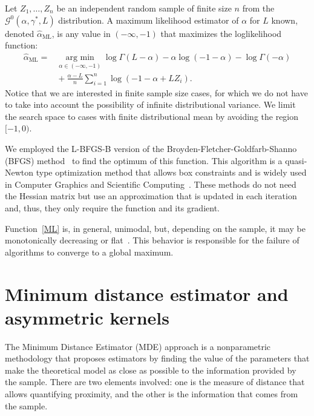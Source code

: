 \documentclass[twocolumn]{svjour3}
\newcommand{\argmin}{\operatorname*{\text{arg min }}}
\begin{document}
	Let $Z_1,\dots, Z_n$ be an independent random sample of finite size $n$ from the $\mathcal G^0(\alpha,\gamma^*,L)$ distribution.
	A maximum likelihood estimator of $\alpha$ for $L$ known, denoted $\widehat\alpha_{\text{{ML}}}$, is any value in $(-\infty,-1)$ that maximizes the loglikelihood function:
	\begin{align}
	\hat{\alpha}_{\text{{ML}}}=&\argmin_{\alpha \in (-\infty,-1)}\log \Gamma(L-\alpha)-
	\alpha\log(-1-\alpha)-\log\Gamma(-\alpha) \nonumber \\
	&\mbox{}+\frac{\alpha-L}{n} \sum_{i=1}^n\log(-1-\alpha+L Z_i).
	\label{ML}
	\end{align}
Notice that we are interested in finite sample size cases, for which we do not have to take into account the possibility of infinite distributional variance.
We limit the search space to cases with finite distributional mean by avoiding the region $[-1,0)$.
	
	We employed the L-BFGS-B version of the Broyden-Fletcher-Goldfarb-Shanno (BFGS) method~\cite{Luenberger2008} to find the optimum of this function. This algorithm is a quasi-Newton type optimization method that allows box constraints and is widely used in Computer Graphics and Scientific Computing~\cite{FEI2014}. 
	These methods do not need the Hessian matrix but use an approximation that is updated in each iteration and, thus, they only require the function and its gradient.
	
	Function~\eqref{ML} is, in general, unimodal, but, depending on the sample, it may be monotonically decreasing or flat~\cite{FreryCribariSouza:JASP:04}. 
	This behavior is responsible for the failure of algorithms to converge to a global maximum.
	
	
	\section{Minimum distance estimator and asymmetric kernels}
	\label{distancekernel}
	
	The Minimum Distance Estimator (MDE) approach is a nonparametric methodology that proposes estimators by finding the value of the parameters that make the theoretical model as close as possible to the information provided by the sample. 
	There are two elements involved: one is the measure of distance that allows quantifying proximity, and the other is the information that comes from the sample.
	
\end{document}
